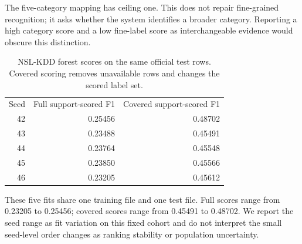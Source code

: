\documentclass[journal]{IEEEtran}
\begin{document}
The five-category mapping has ceiling one. This does not repair fine-grained recognition; it asks whether the system identifies a broader category. Reporting a high category score and a low fine-label score as interchangeable evidence would obscure this distinction.

\begin{table}[h]\centering
\caption{NSL-KDD forest scores on the same official test rows. Covered scoring removes unavailable rows and changes the scored label set.}
\begin{tabular}{rrr}
Seed & Full support-scored F1 & Covered support-scored F1\\
42 & 0.25456 & 0.48702\\
43 & 0.23488 & 0.45491\\
44 & 0.23764 & 0.45548\\
45 & 0.23850 & 0.45566\\
46 & 0.23205 & 0.45612\\
\end{tabular}\end{table}
These five fits share one training file and one test file. Full scores range from 0.23205 to 0.25456; covered scores range from 0.45491 to 0.48702. We report the seed range as fit variation on this fixed cohort and do not interpret the small seed-level order changes as ranking stability or population uncertainty.
\end{document}
